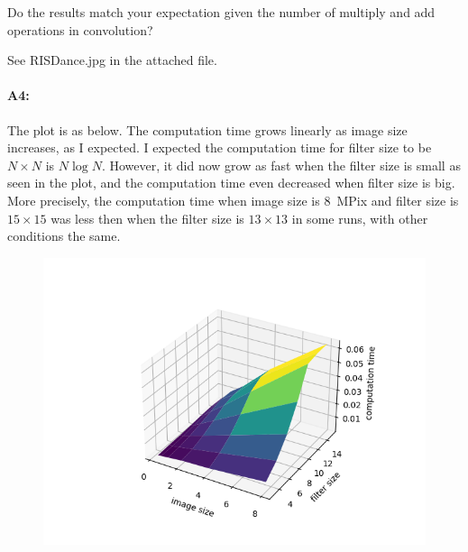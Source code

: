 	Do the results match your expectation given the number of multiply and add operations in convolution?
	
	See RISDance.jpg in the attached file.
	
	\paragraph{A4:} The plot is as below. The computation time grows linearly as image size increases, as I expected. I expected the computation time for filter size to be $N \times N$ is $N\log N$. However, it did now grow as fast when the filter size is small as seen in the plot, and the computation time even decreased when filter size is big. More precisely, the computation time when image size is 8~MPix and filter size is $15\times 15$ was less then when the filter size is $13\times 13$ in some runs, with other conditions the same. 
	\begin{figure}[h]
		\centering
		\includegraphics[width=15cm]{result.png}
		\label{fig:result1}
	\end{figure}
	
	
	
	
	
	
	
	

